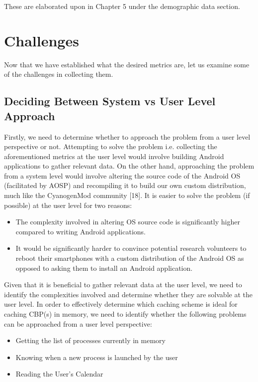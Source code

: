 \documentclass[12pt]{uthesis-v12}  %
\begin{document}
			These are elaborated upon in Chapter 5 under the demographic data section.   
			
	\section{Challenges}
		Now that we have established what the desired metrics are, let us examine some of the challenges in collecting them.  
		
		\subsection{Deciding Between System vs User Level Approach}
			Firstly, we need to determine whether to approach the problem from a user level perspective or not. Attempting to solve the problem i.e. collecting the aforementioned metrics at the user level would involve building Android applications to gather relevant data. On the other hand, approaching the problem from a system level would involve altering the source code of the Android OS (facilitated by AOSP) and recompiling it to build our own custom distribution, much like the CyanogenMod community [18]. It is easier to solve the problem (if possible) at the user level for two reasons:
			
			\begin{itemize}
				\item The complexity involved in altering OS source code is significantly higher compared to writing Android applications.
				\item It would be significantly harder to convince potential research volunteers to reboot their smartphones with a custom distribution of the Android OS as opposed to asking them to install an Android application.
			\end{itemize}
			
			Given that it is beneficial to gather relevant data at the user level, we need to identify the complexities involved and determine whether they are solvable at the user level. In order to effectively determine which caching scheme is ideal for caching CBP(s) in memory, we need to identify whether the following problems can be approached from a user level perspective:
			
			\begin{itemize}
				\item Getting the list of processes currently in memory \checkmark
				\item Knowing when a new process is launched by the user \checkmark
				\item Reading the User's Calendar \checkmark
			\end{itemize} 
			
\end{document}

